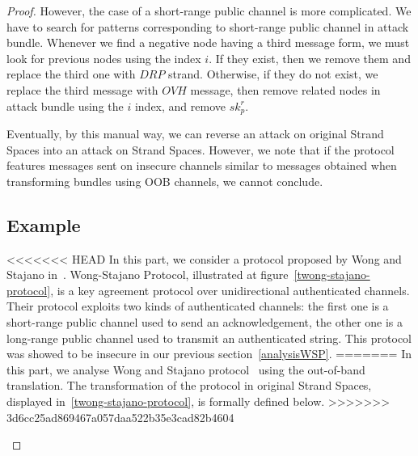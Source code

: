 \begin{Definition}
\begin{table}[b]
\begin{proof}
However, the case of a short-range public channel is more complicated. We have to search for patterns corresponding to short-range public channel in attack bundle. Whenever we find a negative node having a third message form, we must look for previous nodes using the index $i$. If they exist, then we remove them and replace the third one with $DRP$ strand. Otherwise, if they do not exist, we replace the third message with $OVH$ message, then remove related nodes in attack bundle using the $i$ index, and remove $sk^r_p$.

Eventually, by this manual way, we can reverse an attack on original Strand Spaces into an attack on Strand Spaces. However, we note that if the protocol features messages sent on insecure channels similar to messages obtained when transforming bundles using OOB channels, we cannot conclude. 

\subsection{Example}

<<<<<<< HEAD
In this part, we consider a protocol proposed by Wong and Stajano in~\cite{10.1109/MPRV.2007.76}. Wong-Stajano Protocol, illustrated at figure~\ref{twong-stajano-protocol}, is a key agreement protocol over unidirectional authenticated channels. Their protocol exploits two kinds of authenticated channels: the first one is a short-range public channel used to send an acknowledgement, the other one is a long-range public channel used to transmit an authenticated string. This protocol was showed to be insecure in our previous section~\ref{analysisWSP}. 
=======
In this part, we analyse Wong and Stajano protocol~\cite{10.1109/MPRV.2007.76} using the out-of-band translation. The transformation of the protocol in original Strand Spaces, displayed in~\ref{twong-stajano-protocol}, is formally defined below. 
>>>>>>> 3d6cc25ad869467a057daa522b35e3cad82b4604

\begin{figure}[b]
\begin{center}
\end{center}
\end{figure}
\end{proof}
\end{table}
\end{Definition}
